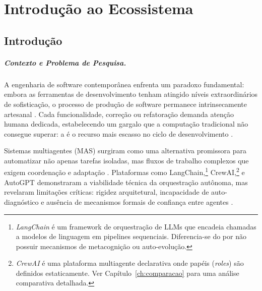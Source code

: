 \chapter*{Introdução ao Ecossistema}
\setcounter{chapter}{1}
\label{ch:introducao}

\section{Introdução}

\paragraph*{Contexto e Problema de Pesquisa.}
A engenharia de software contemporânea enfrenta um paradoxo fundamental:
embora as ferramentas de desenvolvimento tenham atingido níveis
extraordinários de sofisticação, o processo de produção de software
permanece intrinsecamente artesanal \cite{brooks1995mythical}.
Cada funcionalidade, correção ou refatoração demanda atenção humana
dedicada, estabelecendo um gargalo que a computação tradicional não
consegue superar: a  é o recurso mais escasso
no ciclo de desenvolvimento \cite{endres2003software}.

Sistemas multiagentes (MAS) surgiram como uma alternativa promissora para
automatizar não apenas tarefas isoladas, mas fluxos de trabalho complexos
que exigem coordenação e adaptação \cite{wooldridge2009multiagent}.
Plataformas como LangChain,\footnote{\textit{LangChain} é um framework de
orquestração de LLMs que encadeia chamadas a modelos de linguagem em
pipelines sequenciais. Diferencia-se do \opencodeeco{} por não possuir
mecanismos de metacognição ou auto-evolução.} CrewAI,\footnote{\textit{CrewAI}
é uma plataforma multiagente declarativa onde papéis (\textit{roles}) são
definidos estaticamente. Ver Capítulo~\ref{ch:comparacao} para uma análise
comparativa detalhada.} e AutoGPT \cite{significantgravitas2025autogpt}
demonstraram a viabilidade técnica da orquestração autônoma, mas
revelaram limitações críticas: rigidez arquitetural, incapacidade de
auto-diagnóstico e ausência de mecanismos formais de confiança entre
agentes \cite{xi2023rise}.

